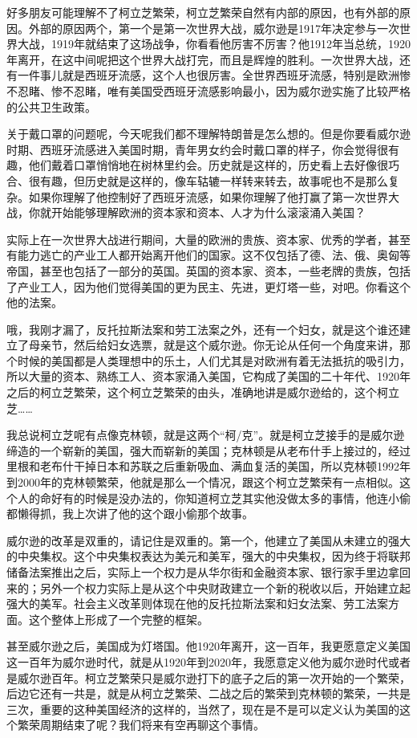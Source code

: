 \documentclass[UTF8, 12pt, a4paper]{ctexrep}
\begin{document}
好多朋友可能理解不了柯立芝繁荣，柯立芝繁荣自然有内部的原因，也有外部的原因。外部的原因两个，第一个是第一次世界大战，威尔逊是1917年决定参与一次世界大战，1919年就结束了这场战争，你看看他厉害不厉害？他1912年当总统，1920年离开，在这中间呢把这个世界大战打完，而且是辉煌的胜利。一次世界大战，还有一件事儿就是西班牙流感，这个人也很厉害。全世界西班牙流感，特别是欧洲惨不忍睹、惨不忍睹，唯有美国受西班牙流感影响最小，因为威尔逊实施了比较严格的公共卫生政策。

关于戴口罩的问题呢，今天呢我们都不理解特朗普是怎么想的。但是你要看威尔逊时期、西班牙流感进入美国时期，青年男女约会时戴口罩的样子，你会觉得很有趣，他们戴着口罩悄悄地在树林里约会。历史就是这样的，历史看上去好像很巧合、很有趣，但历史就是这样的，像车轱辘一样转来转去，故事呢也不是那么复杂。如果你理解了他控制好了西班牙流感，如果你理解了他打赢了第一次世界大战，你就开始能够理解欧洲的资本家和资本、人才为什么滚滚涌入美国？

实际上在一次世界大战进行期间，大量的欧洲的贵族、资本家、优秀的学者，甚至有能力逃亡的产业工人都开始离开他们的国家。这不仅包括了德、法、俄、奥匈等帝国，甚至也包括了一部分的英国。英国的资本家、资本，一些老牌的贵族，包括了产业工人，因为他们觉得美国的更为民主、先进，更灯塔一些，对吧。你看这个他的法案。

哦，我刚才漏了，反托拉斯法案和劳工法案之外，还有一个妇女，就是这个谁还建立了母亲节，然后给妇女选票，就是这个威尔逊。你无论从任何一个角度来讲，那个时候的美国都是人类理想中的乐土，人们尤其是对欧洲有着无法抵抗的吸引力，所以大量的资本、熟练工人、资本家涌入美国，它构成了美国的二十年代、1920年之后的柯立芝繁荣，这个柯立芝繁荣的由头，准确地讲是威尔逊给的，这个柯立芝……

我总说柯立芝呢有点像克林顿，就是这两个“柯/克”。就是柯立芝接手的是威尔逊缔造的一个崭新的美国，强大而崭新的美国；克林顿是从老布什手上接过的，经过里根和老布什干掉日本和苏联之后重新吸血、满血复活的美国，所以克林顿1992年到2000年的克林顿繁荣，他就是那么一个情况，跟这个柯立芝繁荣有一点相似。这个人的命好有的时候是没办法的，你知道柯立芝其实他没做太多的事情，他连小偷都懒得抓，我上次讲了他的这个跟小偷那个故事。

威尔逊的改革是双重的，请记住是双重的。第一个，他建立了美国从未建立的强大的中央集权。这个中央集权表达为美元和美军，强大的中央集权，因为终于将联邦储备法案推出之后，实际上一个权力是从华尔街和金融资本家、银行家手里边拿回来的；另外一个权力实际上是从这个中央财政建立一个新的税收以后，开始建立起强大的美军。社会主义改革则体现在他的反托拉斯法案和妇女法案、劳工法案方面。这个整体上形成了一个完整的框架。

甚至威尔逊之后，美国成为灯塔国。他1920年离开，这一百年，我更愿意定义美国这一百年为威尔逊时代，就是从1920年到2020年，我愿意定义他为威尔逊时代或者是威尔逊百年。柯立芝繁荣只是威尔逊打下的底子之后的第一次开始的一个繁荣，后边它还有一共是，就是从柯立芝繁荣、二战之后的繁荣到克林顿的繁荣，一共是三次，重要的这种美国经济的这样的，当然了，现在是不是可以定义认为美国的这个繁荣周期结束了呢？我们将来有空再聊这个事情。
\end{document}
